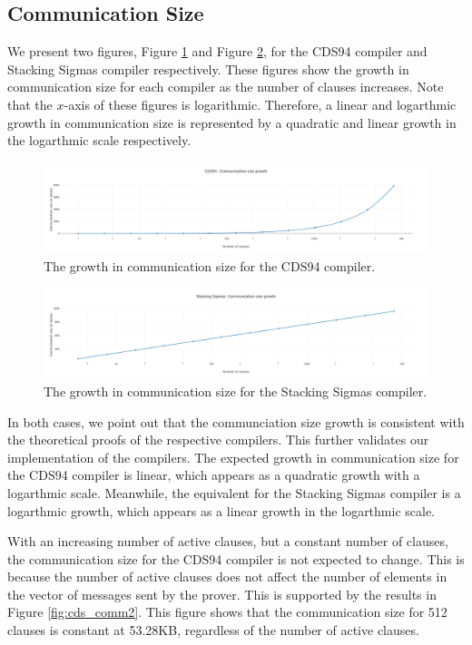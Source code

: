 \subsection{Communication Size}\label{eval:comm}
We present two figures, Figure \ref{fig:cds_comm} and Figure \ref{fig:stacksig_comm},
for the CDS94 compiler and Stacking Sigmas compiler respectively. These figures 
show the growth in communication size for each compiler as the number of clauses
increases. Note that the $x$-axis of these figures is logarithmic. Therefore, a 
linear and logarthmic growth in communication size is represented by a quadratic and linear growth in the logarthmic scale respectively. 
\begin{figure}[h]
  \centering
  \includegraphics[width=\linewidth]{../assets/plots/cds_commsize.png}
  \caption{The growth in communication size for the CDS94 compiler. }
  \label{fig:cds_comm}  
\end{figure}

\begin{figure}[h]
  \centering
  \includegraphics[width=\linewidth]{../assets/plots/ss_commsize.png}
  \caption{The growth in communication size for the Stacking Sigmas compiler. }
  \label{fig:stacksig_comm}
\end{figure}

In both cases, we point out that the communciation size growth is consistent with 
the theoretical proofs of the respective compilers. This further validates our
implementation of the compilers. The expected growth in communication size for
the CDS94 compiler is linear, which appears as a quadratic growth with a 
logarthmic scale. Meanwhile, the equivalent for the Stacking Sigmas compiler is
a logarthmic growth, which appears as a linear growth in the logarthmic scale. 

With an increasing number of active clauses, but a constant number of clauses, 
the communication size for the CDS94 compiler is not expected to change. This is
because the number of active clauses does not affect the number of elements in the 
vector of messages sent by the prover. This is supported by the results in Figure
\ref{fig:cds_comm2}. This figure shows that the communication size for 512 
clauses is constant at 53.28KB, regardless of the number of active clauses.

